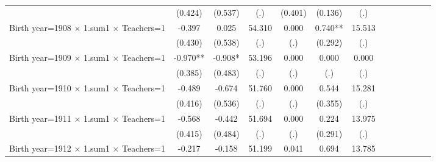 {\begin{tabular}{l*{12}{c}}
                    &     (0.424)   &     (0.537)   &         (.)   &     (0.401)   &     (0.136)   &         (.)   &               &               &               &               &               &               \\
Birth year=1908 $\times$ 1.sum1 $\times$ Teachers=1&      -0.397   &       0.025   &      54.310   &       0.000   &       0.740** &      15.513   &               &               &               &               &               &               \\
                    &     (0.430)   &     (0.538)   &         (.)   &         (.)   &     (0.292)   &         (.)   &               &               &               &               &               &               \\
Birth year=1909 $\times$ 1.sum1 $\times$ Teachers=1&      -0.970** &      -0.908*  &      53.196   &       0.000   &       0.000   &       0.000   &               &               &               &               &               &               \\
                    &     (0.385)   &     (0.483)   &         (.)   &         (.)   &         (.)   &         (.)   &               &               &               &               &               &               \\
Birth year=1910 $\times$ 1.sum1 $\times$ Teachers=1&      -0.489   &      -0.674   &      51.760   &       0.000   &       0.544   &      15.281   &               &               &               &               &               &               \\
                    &     (0.416)   &     (0.536)   &         (.)   &         (.)   &     (0.355)   &         (.)   &               &               &               &               &               &               \\
Birth year=1911 $\times$ 1.sum1 $\times$ Teachers=1&      -0.568   &      -0.442   &      51.694   &       0.000   &       0.224   &      13.975   &               &               &               &               &               &               \\
                    &     (0.415)   &     (0.484)   &         (.)   &         (.)   &     (0.291)   &         (.)   &               &               &               &               &               &               \\
Birth year=1912 $\times$ 1.sum1 $\times$ Teachers=1&      -0.217   &      -0.158   &      51.199   &       0.041   &       0.694   &      13.785   &               &               &               &               &               &               \\

\end{tabular}}
